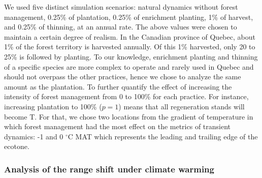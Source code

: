 We used five distinct simulation scenarios: natural dynamics without
forest management, 0.25\% of plantation, 0.25\% of enrichment planting,
1\% of harvest, and 0.25\% of thinning, at an annual rate. The above
values were chosen to maintain a certain degree of realism. In the
Canadian province of Quebec, about 1\% of the forest territory is
harvested annually. Of this 1\% harvested, only 20 to 25\% is followed
by planting. To our knowledge, enrichment planting and thinning of a
specific species are more complex to operate and rarely used in Quebec
and should not overpass the other practices, hence we chose to analyze
the same amount as the plantation. To further quantify the effect of
increasing the intensity of forest management from 0 to 100\% for each
practice. For instance, increasing plantation to 100\% (\(p = 1\)) means
that all regeneration stands will become T. For that, we chose two
locations from the gradient of temperature in which forest management
had the most effect on the metrics of transient dynamics: -1 and 0
\(^{\circ}\)C MAT which represents the leading and trailing edge of the
ecotone.

\hypertarget{analysis-of-the-range-shift-under-climate-warming}{%
\subsubsection{Analysis of the range shift under climate
warming}\label{analysis-of-the-range-shift-under-climate-warming}}

